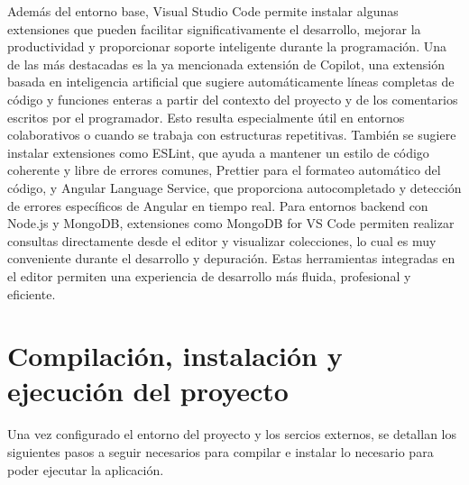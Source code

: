 Además del entorno base, Visual Studio Code permite instalar algunas extensiones que pueden facilitar significativamente el desarrollo, mejorar la productividad y proporcionar soporte inteligente durante la programación. Una de las más destacadas es la ya mencionada extensión de Copilot, una extensión basada en inteligencia artificial que sugiere automáticamente líneas completas de código y funciones enteras a partir del contexto del proyecto y de los comentarios escritos por el programador. Esto resulta especialmente útil en entornos colaborativos o cuando se trabaja con estructuras repetitivas. También se sugiere instalar extensiones como ESLint, que ayuda a mantener un estilo de código coherente y libre de errores comunes, Prettier para el formateo automático del código, y Angular Language Service, que proporciona autocompletado y detección de errores específicos de Angular en tiempo real. Para entornos backend con Node.js y MongoDB, extensiones como MongoDB for VS Code permiten realizar consultas directamente desde el editor y visualizar colecciones, lo cual es muy conveniente durante el desarrollo y depuración. Estas herramientas integradas en el editor permiten una experiencia de desarrollo más fluida, profesional y eficiente.

\section{Compilación, instalación y ejecución del proyecto}
\label{sec:compilacion}

Una vez configurado el entorno del proyecto y los sercios externos, se detallan los siguientes pasos a seguir necesarios para compilar e instalar lo necesario para poder ejecutar la aplicación.

